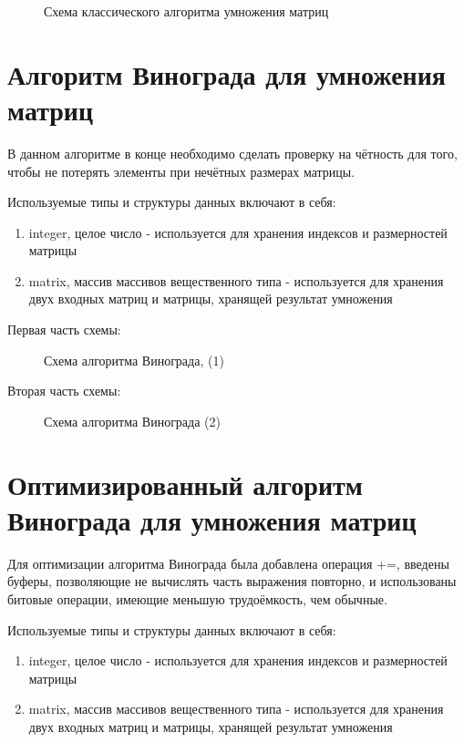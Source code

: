 \newpage

\begin{figure}[ph!]
	\caption{Схема классического алгоритма умножения матриц}
\end{figure}

\section{Алгоритм Винограда для умножения матриц}

В данном алгоритме в конце необходимо сделать проверку на чётность для того, чтобы не потерять элементы при нечётных размерах матрицы.

Используемые типы и структуры данных включают в себя:
\begin{enumerate}
	\item integer, целое число - используется для хранения индексов и размерностей матрицы
	\item matrix, массив массивов вещественного типа - используется для хранения двух входных матриц и матрицы, хранящей результат умножения
\end{enumerate}

\newpage
Первая часть схемы:
\begin{figure}[ph!]
	\caption{Схема алгоритма Винограда, (1)}
\end{figure}

\newpage
Вторая часть схемы:
\begin{figure}[ph!]
	\caption{Схема алгоритма Винограда (2)}
\end{figure}

\section{Оптимизированный алгоритм Винограда для умножения матриц}

Для оптимизации алгоритма Винограда была добавлена операция +=, введены буферы, позволяющие не вычислять часть выражения повторно, и использованы битовые операции, имеющие меньшую трудоёмкость, чем обычные.

Используемые типы и структуры данных включают в себя:
\begin{enumerate}
	\item integer, целое число - используется для хранения индексов и размерностей матрицы
	\item matrix, массив массивов вещественного типа - используется для хранения двух входных матриц и матрицы, хранящей результат умножения
\end{enumerate}

